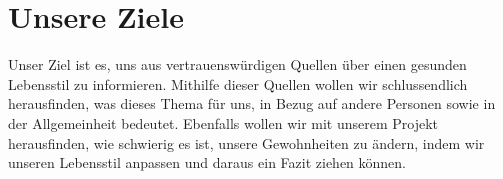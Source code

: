 \chapter{Unsere Ziele}
\authortoc{\bastian}{\chapterident}
Unser Ziel ist es, uns aus vertrauenswürdigen Quellen über einen gesunden Lebensstil zu informieren. Mithilfe dieser Quellen wollen wir schlussendlich herausfinden, was dieses Thema für uns, in Bezug auf andere Personen sowie in der Allgemeinheit bedeutet. Ebenfalls wollen wir mit unserem Projekt herausfinden, wie schwierig es ist, unsere Gewohnheiten zu ändern, indem wir unseren Lebensstil anpassen und daraus ein Fazit ziehen können.
